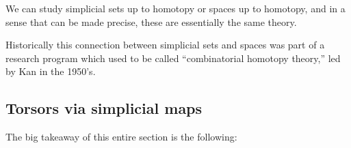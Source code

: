 \documentclass[11pt,openany]{book}
\begin{document}
\begin{remark} We can study simplicial sets up to homotopy or spaces up to homotopy, and in a sense that can be made precise, these are essentially the same theory.
\end{remark}

\begin{remark} Historically this connection between simplicial sets and spaces was part of a research program which used to be called ``combinatorial homotopy theory,'' led by Kan in the 1950's. %
\end{remark}





\subsection{Torsors via simplicial maps}

The big takeaway of this entire section is the following:
\end{document}
